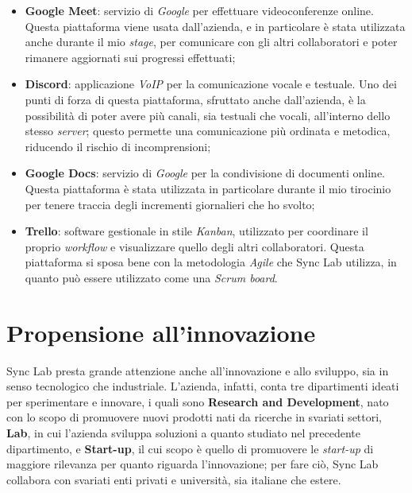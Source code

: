 \begin{itemize}
  \item \textbf{Google Meet}: servizio di \textit{Google} per effettuare videoconferenze online. Questa piattaforma viene usata dall'azienda, e in particolare è stata utilizzata anche durante il mio \textit{stage}, per comunicare con gli altri collaboratori e poter rimanere aggiornati sui progressi effettuati;

  \item \textbf{Discord}: applicazione \textit{VoIP} per la comunicazione vocale e testuale. Uno dei punti di forza di questa piattaforma, sfruttato anche dall'azienda, è la possibilità di poter avere più canali, sia testuali che vocali, all'interno dello stesso \textit{server}; questo permette una comunicazione più ordinata e metodica, riducendo il rischio di incomprensioni;

  \item \textbf{Google Docs}: servizio di \textit{Google} per la condivisione di documenti online. Questa piattaforma è stata utilizzata in particolare durante il mio tirocinio per tenere traccia degli incrementi giornalieri che ho svolto;

  \item \textbf{Trello}: software gestionale in stile \textit{Kanban}, utilizzato per coordinare il proprio \textit{workflow} e visualizzare quello degli altri collaboratori. Questa piattaforma si sposa bene con la metodologia \textit{Agile} che Sync Lab utilizza, in quanto può essere utilizzato come una \textit{Scrum board}.
\end{itemize}


\section{Propensione all'innovazione}

Sync Lab presta grande attenzione anche all'innovazione e allo sviluppo, sia in senso tecnologico che industriale. L'azienda, infatti, conta tre dipartimenti ideati per sperimentare e innovare, i quali sono \textbf{Research and Development}, nato con lo scopo di promuovere nuovi prodotti nati da ricerche in svariati settori, \textbf{Lab}, in cui l'azienda sviluppa soluzioni a quanto studiato nel precedente dipartimento, e \textbf{Start-up}, il cui scopo è quello di promuovere le \textit{start-up} di maggiore rilevanza per quanto riguarda l'innovazione; per fare ciò, Sync Lab collabora con svariati enti privati e università, sia italiane che estere. \\

